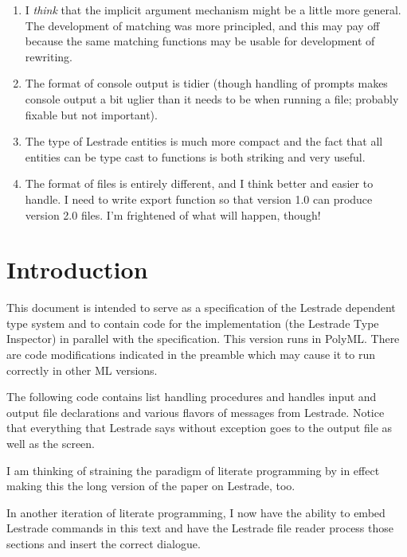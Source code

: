 \documentclass[12pt]{article}
\begin{document}
\begin{description}
\begin{enumerate}
\item  I {\em think\/} that the implicit argument mechanism might be a little more general.  The development
of matching was more principled, and this may pay off because the same matching functions may be usable for
development of rewriting.

\item  The format of console output is tidier (though handling of prompts makes console output
a bit uglier than it needs to be when running a file;  probably fixable but not important).

\item  The type of Lestrade entities is much more compact and the fact that all entities can
be type cast to functions is both striking and very useful.

\item  The format of files is entirely different, and I think better and easier to handle.  I need to write export function so that version 1.0 can produce version 2.0 files.  I'm frightened of what will happen, though!

\end{enumerate}



\end{description}

\newpage

\section{Introduction}

This document is intended to serve as a specification of the Lestrade dependent type system and to contain code for the implementation (the Lestrade Type Inspector)  in parallel with the specification.    This version runs in PolyML.  There are code modifications indicated in the preamble which may cause it to run correctly in other ML versions.

The following code contains list handling procedures and handles input and output file declarations and various flavors of messages from Lestrade.  Notice that everything
that Lestrade says without exception goes to the output file as well as the screen.

I am thinking of straining the paradigm of literate programming by in effect making this the long version of the paper on Lestrade, too.

In another iteration of literate programming, I now have the ability to embed Lestrade commands in this text and have the Lestrade file reader process those sections
and insert the correct dialogue.
\end{document}
